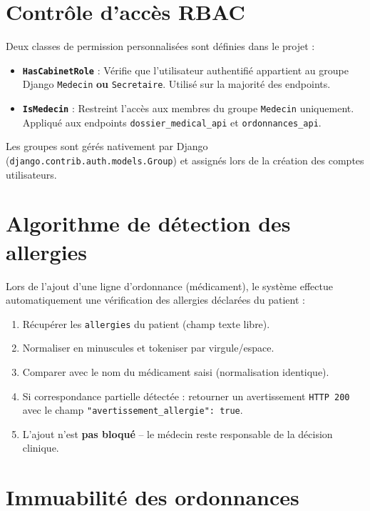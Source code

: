 \documentclass[12pt,a4paper]{report}
\begin{document}
\section{Contrôle d'accès RBAC}

Deux classes de permission personnalisées sont définies dans le projet :

\begin{itemize}[leftmargin=*]
  \item \textbf{\texttt{HasCabinetRole}} : Vérifie que l'utilisateur authentifié appartient au groupe Django \texttt{Medecin} \textbf{ou} \texttt{Secretaire}. Utilisé sur la majorité des endpoints.
  \item \textbf{\texttt{IsMedecin}} : Restreint l'accès aux membres du groupe \texttt{Medecin} uniquement. Appliqué aux endpoints \texttt{dossier\_medical\_api} et \texttt{ordonnances\_api}.
\end{itemize}

Les groupes sont gérés nativement par Django (\texttt{django.contrib.auth.models.Group}) et assignés lors de la création des comptes utilisateurs.

\section{Algorithme de détection des allergies}

Lors de l'ajout d'une ligne d'ordonnance (médicament), le système effectue automatiquement une vérification des allergies déclarées du patient :

\begin{enumerate}[leftmargin=*]
  \item Récupérer les \texttt{allergies} du patient (champ texte libre).
  \item Normaliser en minuscules et tokeniser par virgule/espace.
  \item Comparer avec le nom du médicament saisi (normalisation identique).
  \item Si correspondance partielle détectée : retourner un avertissement \texttt{HTTP 200} avec le champ \texttt{"avertissement\_allergie": true}.
  \item L'ajout n'est \textbf{pas bloqué} -- le médecin reste responsable de la décision clinique.
\end{enumerate}

\section{Immuabilité des ordonnances}
\end{document}
